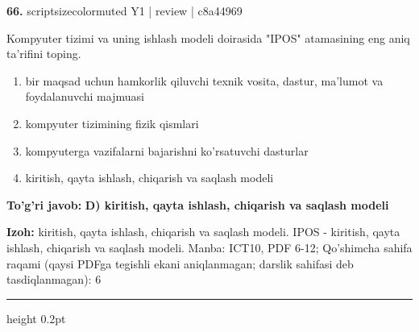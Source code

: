 \documentclass[10pt,a4paper]{article}
\begin{document}
{\bfseries\sffamily\color{ink} 66.} {scriptsizecolor{muted} Y1 | review | c8a44969}
\par
Kompyuter tizimi va uning ishlash modeli doirasida "IPOS" atamasining eng aniq ta'rifini toping.
\begin{enumerate}[label=\Alph*),leftmargin=9mm]
\item bir maqsad uchun hamkorlik qiluvchi texnik vosita, dastur, ma'lumot va foydalanuvchi majmuasi
\item kompyuter tizimining fizik qismlari
\item kompyuterga vazifalarni bajarishni ko'rsatuvchi dasturlar
\item kiritish, qayta ishlash, chiqarish va saqlash modeli
\end{enumerate}
\begin{tcolorbox}[enhanced,breakable,colback=teal!4,colframe=teal!60!black,boxrule=0.45pt,arc=1.2mm,left=2.7mm,right=2.7mm,top=1.8mm,bottom=1.8mm,before skip=2mm,after skip=2mm]
{\bfseries\sffamily\color{teal}To'g'ri javob:} \textbf{D) kiritish, qayta ishlash, chiqarish va saqlash modeli}
\par\smallskip
{\bfseries Izoh:} kiritish, qayta ishlash, chiqarish va saqlash modeli. IPOS - kiritish, qayta ishlash, chiqarish va saqlash modeli. Manba: ICT10, PDF 6-12; Qo'shimcha sahifa raqami (qaysi PDFga tegishli ekani aniqlanmagan; darslik sahifasi deb tasdiqlanmagan): 6
\end{tcolorbox}
\vspace{2mm}\hrule height 0.2pt\vspace{3mm}
\end{document}
